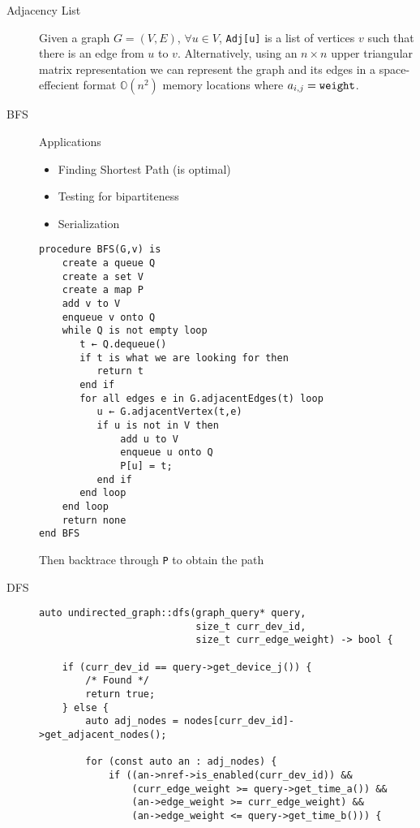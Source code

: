\documentclass[8pt]{article}
\begin{document}

\begin{multicols}{2}
  \begin{description}
  \item[Adjacency List] Given a graph $G=(V,E)$, $\forall u \in V$,
    \verb|Adj[u]| is a list of vertices $v$ such that there is an edge
    from $u$ to $v$. Alternatively, using an $n \times n$ upper
    triangular matrix representation we can represent the graph and
    its edges in a space-effecient format $\mathbb{O}(n^2)$ memory
    locations where $a_{i,j}=\verb|weight|$.
  \item[BFS] Applications
    \begin{itemize}
    \item Finding Shortest Path (is optimal)
    \item Testing for bipartiteness
    \item Serialization
    \end{itemize}
    { \footnotesize
\begin{verbatim}
procedure BFS(G,v) is
    create a queue Q
    create a set V
    create a map P
    add v to V
    enqueue v onto Q
    while Q is not empty loop
       t ← Q.dequeue()
       if t is what we are looking for then
          return t
       end if
       for all edges e in G.adjacentEdges(t) loop
          u ← G.adjacentVertex(t,e)
          if u is not in V then
              add u to V
              enqueue u onto Q
              P[u] = t;
          end if
       end loop
    end loop
    return none
end BFS
\end{verbatim}
      Then backtrace through \verb|P| to obtain the path
    }
  \item[DFS]
    { \footnotesize
\begin{verbatim}
auto undirected_graph::dfs(graph_query* query,
                           size_t curr_dev_id,
                           size_t curr_edge_weight) -> bool {

    if (curr_dev_id == query->get_device_j()) {
        /* Found */
        return true;
    } else {
        auto adj_nodes = nodes[curr_dev_id]->get_adjacent_nodes();

        for (const auto an : adj_nodes) {
            if ((an->nref->is_enabled(curr_dev_id)) &&
                (curr_edge_weight >= query->get_time_a()) &&
                (an->edge_weight >= curr_edge_weight) &&
                (an->edge_weight <= query->get_time_b())) {


\end{verbatim}}
\end{description}
\end{multicols}
\end{document}
